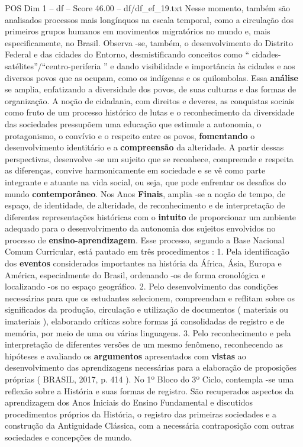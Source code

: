 \begin{textsample}{POS Dim 1 – df – Score 46.00 – df/df\_ef\_19.txt}
Nesse momento, também são analisados processos mais longínquos na escala temporal, como a circulação dos primeiros grupos humanos em movimentos migratórios no mundo e, mais especificamente, no Brasil.
Observa -se, também, o desenvolvimento do Distrito Federal e das cidades do Entorno, desmistificando conceitos como “ cidades-satélites”/“centro-periferia ” e dando visibilidade e importância às cidades e aos diversos povos que as ocupam, como os indígenas e os quilombolas.
Essa \textbf{análise} se amplia, enfatizando a diversidade dos povos, de suas culturas e das formas de organização.
A noção de cidadania, com direitos e deveres, as conquistas sociais como fruto de um processo histórico de lutas e o reconhecimento da diversidade das sociedades pressupõem uma educação que estimule a autonomia, o protagonismo, o convívio e o respeito entre os povos, \textbf{fomentando} o desenvolvimento identitário e a \textbf{compreensão} da alteridade.
A partir dessas perspectivas, desenvolve -se um sujeito que se reconhece, compreende e respeita as diferenças, convive harmonicamente em sociedade e se vê como parte integrante e atuante na vida social, ou seja, que pode enfrentar os desafios do mundo \textbf{contemporâneo}.
Nos Anos \textbf{Finais}, amplia -se a noção de tempo, de espaço, de identidade, de alteridade, de reconhecimento e de interpretação de diferentes representações históricas com o \textbf{intuito} de proporcionar um ambiente adequado para o desenvolvimento da autonomia dos sujeitos envolvidos no processo de \textbf{ensino-aprendizagem}.
Esse processo, segundo a Base Nacional Comum Curricular, está pautado em três procedimentos : 1.
Pela identificação dos \textbf{eventos} considerados importantes na história da África, Ásia, Europa e América, especialmente do Brasil, ordenando -os de forma cronológica e localizando -os no espaço geográfico. 2.
Pelo desenvolvimento das condições necessárias para que os estudantes selecionem, compreendam e reflitam sobre os significados da produção, circulação e utilização de documentos ( materiais ou imateriais ), elaborando críticas sobre formas já consolidadas de registro e de memória, por meio de uma ou várias linguagens. 3.
Pelo reconhecimento e pela interpretação de diferentes versões de um mesmo fenômeno, reconhecendo as hipóteses e avaliando os \textbf{argumentos} apresentados com \textbf{vistas} ao desenvolvimento das aprendizagens necessárias para a elaboração de proposições próprias ( BRASIL, 2017, p. 414 ).
No 1º Bloco do 3º Ciclo, contempla -se uma reflexão sobre a História e suas formas de registro.
São recuperados aspectos da aprendizagem dos Anos Iniciais do Ensino Fundamental e discutidos procedimentos próprios da História, o registro das primeiras sociedades e a construção da Antiguidade Clássica, com a necessária contraposição com outras sociedades e concepções de mundo.

\end{textsample}
